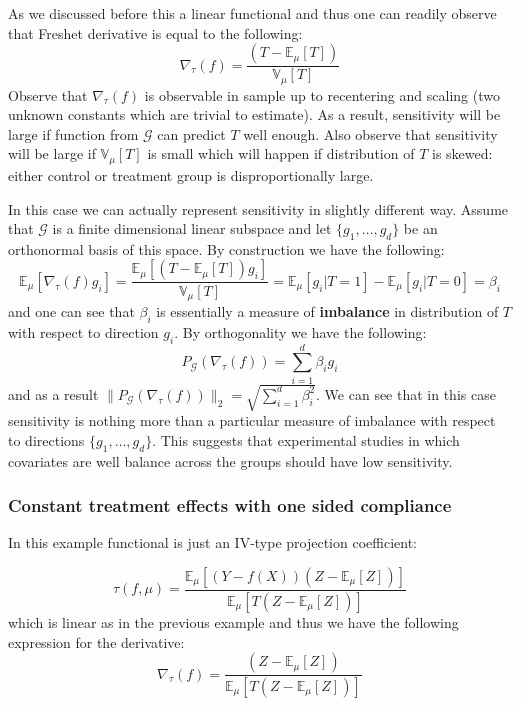 \documentclass[12pt]{article}
\theoremstyle{plain}
\begin{document}
As we discussed before this a linear functional and thus one can readily observe that Freshet derivative is equal to the following:
\begin{equation} 
\nabla_{\tau}(f) = \frac{(T-\mathbb{E}_{\mu}[T])}{\mathbb{V}_{\mu}[T]}
\end{equation}
Observe that $\nabla_{\tau}(f)$ is observable in sample up to recentering and scaling (two unknown constants which are trivial to estimate). As a result, sensitivity will be large if function from $\mathcal{G}$ can predict $T$ well enough. Also observe that sensitivity will be large if $\mathbb{V}_{\mu}[T]$ is small which will happen if distribution of $T$ is skewed: either control or treatment group is disproportionally large. 

In this case we can actually represent sensitivity in slightly different way. Assume that $\mathcal{G}$ is a finite dimensional linear subspace and let $\{g_1,\dots, g_d\}$ be an orthonormal basis of this space. By construction we have the following:
\begin{equation}
\mathbb{E}_{\mu}[\nabla_{\tau}(f) g_i] =  \frac{\mathbb{E}_{\mu}[(T-\mathbb{E}_{\mu}[T])g_i]}{\mathbb{V}_{\mu}[T]} = \mathbb{E}_{\mu}[g_i|T=1]- \mathbb{E}_{\mu}[g_i|T=0]=\beta_i
\end{equation}
and one can see that $\beta_i$ is essentially a measure of \textbf{imbalance} in distribution of $T$ with respect to direction $g_i$. By orthogonality we have the following:
\begin{equation}
P_{\mathcal{G}}(\nabla_{\tau}(f)) = \sum_{i=1}^d\beta_i g_i
\end{equation}
and as a result $\|P_{\mathcal{G}}(\nabla_{\tau}(f))\|_2 = \sqrt{\sum_{i=1}^d \beta_i^2}$. We can see that in this case sensitivity is nothing more than a particular measure of imbalance with respect to directions $\{g_1,\dots, g_d\}$. This suggests that experimental studies in which covariates are well balance across the groups should have low sensitivity. 

\subsubsection{Constant treatment effects with one sided compliance}

In this example functional is just an IV-type projection coefficient:

\begin{equation}
\tau(f,\mu) =  \frac{\mathbb{E}_{\mu}\left[(Y-f(X))(Z-\mathbb{E}_{\mu}[Z])\right]}{\mathbb{E}_{\mu}\left[T(Z-\mathbb{E}_{\mu}[Z])\right]} 
\end{equation}
which is linear as in the previous example and thus we have the following expression for the derivative:
\begin{equation}
\nabla_{\tau}(f) =  \frac{(Z-\mathbb{E}_{\mu}[Z])}{\mathbb{E}_{\mu}\left[T(Z-\mathbb{E}_{\mu}[Z])\right]} 
\end{equation}
\end{document}
